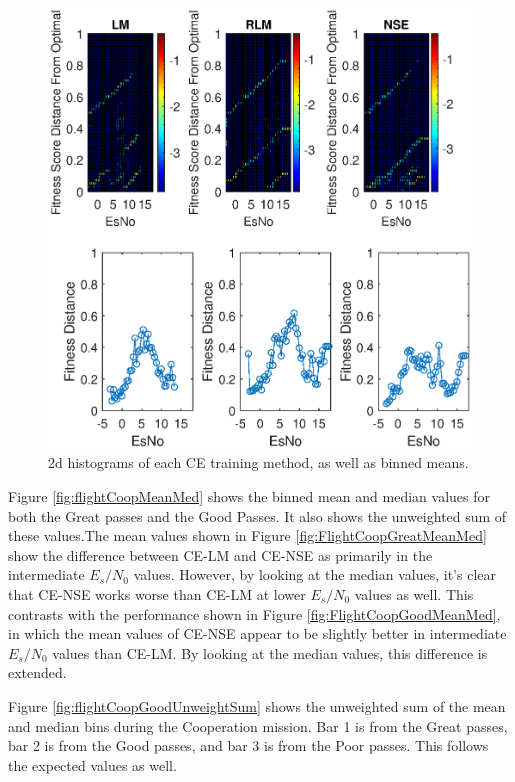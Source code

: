 \begin{figure}[ht]
\centering
\includegraphics[width=\textwidth]{figures/flight_results/coop_good_2dhist.eps}
\caption{2d histograms of each CE training method, as well as binned means.}
\label{fig:coop_good_2dhist}
\end{figure}

\par Figure \ref{fig:flightCoopMeanMed} shows the binned mean and median values for both the Great passes and the Good Passes. It also shows the unweighted sum of these values.The mean values shown in Figure \ref{fig:FlightCoopGreatMeanMed} show the difference between CE-LM and CE-NSE as primarily in the intermediate $E_s/N_0$ values. However, by looking at the median values, it's clear that CE-NSE works worse than CE-LM at lower $E_s/N_0$ values as well. This contrasts with the performance shown in Figure \ref{fig:FlightCoopGoodMeanMed}, in which the mean values of CE-NSE appear to  be slightly better in intermediate $E_s/N_0$ values than CE-LM. By looking at the median values, this difference is extended. 
\par Figure \ref{fig:flightCoopGoodUnweightSum} shows the unweighted sum of the mean and median bins during the Cooperation mission. Bar 1 is from the Great passes, bar 2 is from the Good passes, and bar 3 is from the Poor passes. This follows the expected values as well.

